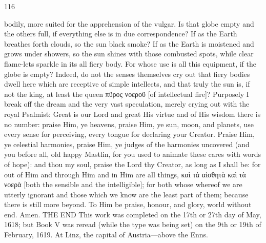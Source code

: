 \documentclass{article}
\begin{document}
116

bodily, more suited for the apprehension of the vulgar. Is that globe
empty and the others full, if everything else is in due correspondence? If
as the Earth breathes forth clouds, so the sun black smoke?
If as the Earth is moistened and grows under showers, so the sun shines
with those combusted spots, while clear flame-lets sparkle in its all fiery
body. For whose use is all this equipment, if the globe is empty? Indeed,
do not the senses themselves cry out that fiery bodies dwell here which
are receptive of simple intellects, and that truly the sun is, if not the king,
at least the queen πῦρος νοεροῦ [of intellectual fire]?
Purposely I break off the dream and the very vast speculation, merely
crying out with the royal Psalmist:
Great is our Lord and great His virtue and of His wisdom there is no
number: praise Him, ye heavens, praise Him, ye sun, moon, and planets,
use every sense for perceiving, every tongue for declaring your Creator.
Praise Him, ye celestial harmonies, praise Him, ye judges of the
harmonies uncovered (and you before all, old happy Mastlin, for you
used to animate these cares with words of hope): and thou my soul,
praise the Lord thy Creator, as long as I shall be: for out of Him and
through Him and in Him are all things, καὶ τἀ αἰσθητὰ καὶ τὰ νοερὰ [both
the sensible and the intelligible]; for both whose whereof we are utterly
ignorant and those which we know are the least part of them; because
there is still more beyond. To Him be praise, honour, and glory, world
without end. Amen.
THE END
This work was completed on the 17th or 27th day of May, 1618; but Book V was
reread (while the type was being set) on the 9th or 19th of February, 1619. At Linz,
the capital of Austria—above the Enns.
\end{document}
